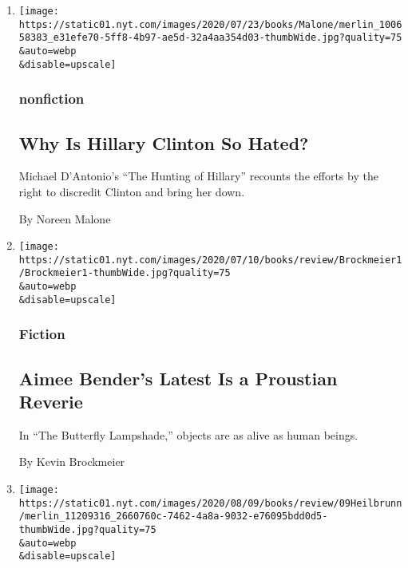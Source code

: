 \begin{enumerate}
\def\labelenumi{\arabic{enumi}.}
\item
  \href{/2020/07/28/books/review/the-hunting-of-hillary-michael-dantonio.html}{}

  \texttt{[image: https://static01.nyt.com/images/2020/07/23/books/Malone/merlin\_100658383\_e31efe70-5ff8-4b97-ae5d-32a4aa354d03-thumbWide.jpg?quality=75\\\&auto=webp\\\&disable=upscale]}

  \hypertarget{nonfiction}{%
  \subsubsection{nonfiction}\label{nonfiction}}

  \hypertarget{why-is-hillary-clinton-so-hated-1}{%
  \subsection{Why Is Hillary Clinton So
  Hated?}\label{why-is-hillary-clinton-so-hated-1}}

  Michael D'Antonio's ``The Hunting of Hillary'' recounts the efforts by
  the right to discredit Clinton and bring her down.

  By Noreen Malone
\item
  \href{/2020/07/28/books/review/aimee-bender-the-butterfly-lampshade.html}{}

  \texttt{[image: https://static01.nyt.com/images/2020/07/10/books/review/Brockmeier1/Brockmeier1-thumbWide.jpg?quality=75\\\&auto=webp\\\&disable=upscale]}

  \hypertarget{fiction}{%
  \subsubsection{Fiction}\label{fiction}}

  \hypertarget{aimee-benders-latest-is-a-proustian-reverie-1}{%
  \subsection{Aimee Bender's Latest Is a Proustian
  Reverie}\label{aimee-benders-latest-is-a-proustian-reverie-1}}

  In ``The Butterfly Lampshade,'' objects are as alive as human beings.

  By Kevin Brockmeier
\item
  \href{/2020/07/28/books/review/to-start-a-war-robert-draper.html}{}

  \texttt{[image: https://static01.nyt.com/images/2020/08/09/books/review/09Heilbrunn/merlin\_11209316\_2660760c-7462-4a8a-9032-e76095bdd0d5-thumbWide.jpg?quality=75\\\&auto=webp\\\&disable=upscale]}


\end{enumerate}
